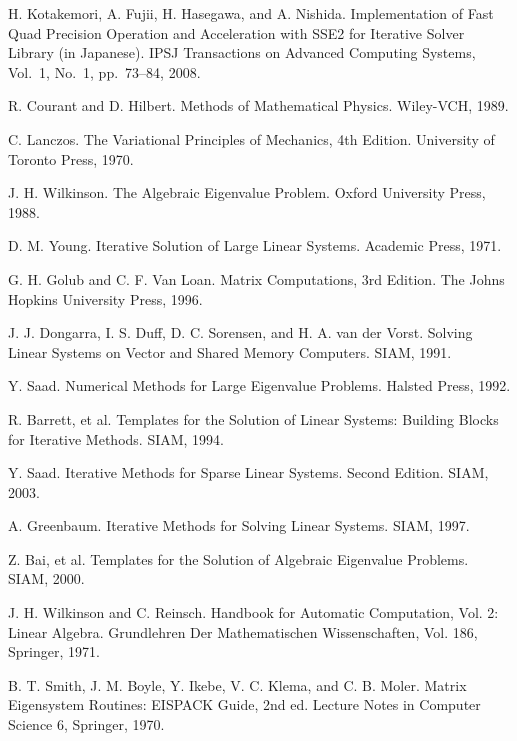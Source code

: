 \documentclass[a4paper]{article}
\begin{document}
\begin{thebibliography}{10}
H. Kotakemori, A. Fujii, H. Hasegawa, and A. Nishida.
\newblock Implementation of Fast Quad Precision Operation and
	Acceleration with SSE2 for Iterative Solver Library (in
	Japanese).
\newblock IPSJ Transactions on Advanced Computing Systems,  Vol.~1, No.~1, pp.\ 73--84, 2008.

R. Courant and D. Hilbert.
\newblock Methods of Mathematical Physics. 
\newblock Wiley-VCH, 1989.

C. Lanczos. 
\newblock The Variational Principles of Mechanics, 4th Edition. 
\newblock University of Toronto Press, 1970.

J. H. Wilkinson. 
\newblock The Algebraic Eigenvalue Problem. 
\newblock Oxford University Press, 1988.

D. M. Young. 
\newblock Iterative Solution of Large Linear Systems. 
\newblock Academic Press, 1971.

G. H. Golub and C. F. Van Loan.
\newblock Matrix Computations, 3rd Edition.
\newblock The Johns Hopkins University Press, 1996.

J. J. Dongarra, I. S. Duff, D. C. Sorensen, and H. A. van der Vorst.
\newblock Solving Linear Systems on Vector and Shared Memory Computers.
\newblock SIAM, 1991.

Y. Saad.
\newblock Numerical Methods for Large Eigenvalue Problems. 
\newblock Halsted Press, 1992.

R. Barrett, et al.
\newblock Templates for the Solution of Linear Systems: Building Blocks for Iterative Methods.
\newblock SIAM, 1994.

Y. Saad.
\newblock Iterative Methods for Sparse Linear Systems. Second Edition. 
\newblock SIAM, 2003.

A. Greenbaum.
\newblock Iterative Methods for Solving Linear Systems.
\newblock SIAM, 1997.

Z. Bai, et al.
\newblock Templates for the Solution of Algebraic Eigenvalue Problems.
\newblock SIAM, 2000.

J. H. Wilkinson and C. Reinsch.
\newblock Handbook for Automatic Computation, Vol. 2: Linear Algebra.
\newblock Grundlehren Der Mathematischen Wissenschaften, Vol. 186, Springer, 1971.

B. T. Smith, J. M. Boyle, Y. Ikebe, V. C. Klema, and C. B. Moler.
\newblock Matrix Eigensystem Routines: EISPACK Guide, 2nd ed.
\newblock Lecture Notes in Computer Science 6, Springer, 1970.


\end{thebibliography}
\end{document}
